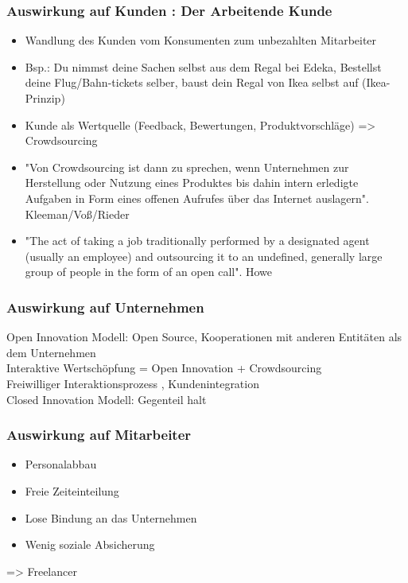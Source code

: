 	\subsubsection{Auswirkung auf Kunden : Der Arbeitende Kunde}
	\begin{itemize}
	\item Wandlung des Kunden vom Konsumenten zum unbezahlten Mitarbeiter
	\item Bsp.: Du nimmst deine Sachen selbst aus dem Regal bei Edeka, Bestellst deine Flug/Bahn-tickets selber, baust dein Regal von Ikea selbst auf (Ikea-Prinzip)
	\item Kunde als Wertquelle (Feedback, Bewertungen, Produktvorschläge) => Crowdsourcing
	\item
	"Von Crowdsourcing ist dann zu sprechen, wenn Unternehmen zur Herstellung oder Nutzung eines Produktes bis dahin intern erledigte Aufgaben in Form eines offenen Aufrufes über das Internet auslagern". Kleeman/Voß/Rieder
	\item
	"The act of taking a job traditionally performed by a designated agent (usually an employee) and outsourcing it to an undefined, generally large group of people in the form of an open call". Howe
	\end{itemize}
	\begin{multicols}{2}
	\subsubsection{Auswirkung auf Unternehmen}
	Open Innovation Modell: Open Source, Kooperationen mit anderen Entitäten als dem Unternehmen \\ 
	Interaktive Wertschöpfung = Open Innovation + Crowdsourcing \\ Freiwilliger Interaktionsprozess , Kundenintegration \\
	Closed Innovation Modell: Gegenteil halt
	\subsubsection{Auswirkung auf Mitarbeiter}
	\begin{itemize}
	\item Personalabbau
	\item Freie Zeiteinteilung
	\item Lose Bindung an das Unternehmen
	\item Wenig soziale Absicherung
	\end{itemize}
	=> Freelancer
	\end{multicols}